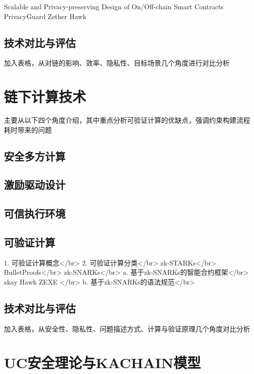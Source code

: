 Scalable and Privacy-preserving Design of
On/Off-chain Smart Contracts
PrivacyGuard
Zether
Hawk

\subsection{技术对比与评估}

加入表格，从对链的影响、效率、隐私性、目标场景几个角度进行对比分析

\section{链下计算技术}
主要从以下四个角度介绍，其中重点分析可验证计算的优缺点，强调约束构建流程耗时带来的问题

\subsection{安全多方计算}

\subsection{激励驱动设计}

\subsection{可信执行环境}

\subsection{可验证计算}

1. 可验证计算概念</br>
2. 可验证计算分类</br>
zk-STARKs</br>
BulletProofs</br>
zk-SNARKs</br>
a. 基于zk-SNARKs的智能合约框架</br>
zkay Hawk ZEXE </br>
b. 基于zk-SNARKs的语法规范</br>

\subsection{技术对比与评估}

加入表格，从安全性、隐私性、问题描述方式、计算与验证原理几个角度对比分析

\section{UC安全理论与KACHAIN模型}